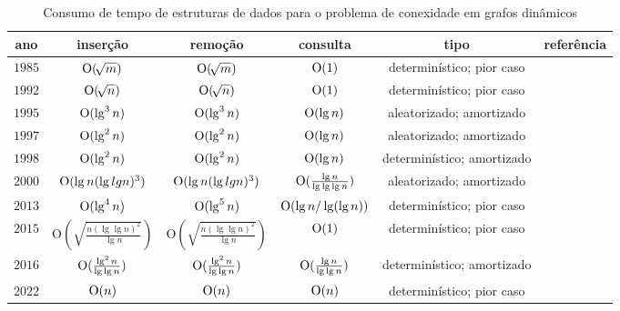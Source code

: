 \begin{table}[h!]
\centering
\begin{tabular}{||c | c | c | c | c | c||} 
 \hline
 ano & inserção & remoção & consulta & tipo & referência \\ [0.5ex] 
 \hline\hline
  $1985$ & $\mathrm{O}(\!\sqrt{m})$ & $\mathrm{O}(\!\sqrt{m})$ & $\mathrm{O}(1)$  & determinístico; pior caso& \cite{frederickson1983data} \\ 
 \hline
  $1992$ & $\mathrm{O}(\!\sqrt{n})$ & $\mathrm{O}(\!\sqrt{n})$ & $\mathrm{O}(1)$  & determinístico; pior caso& \cite{Eppstein1992SparsificationaTF} \\ 
 \hline
  $1995$ & $\mathrm{O}(\lg^3 n)$ & $\mathrm{O}(\lg^3 n)$   & $\mathrm{O}(\lg n)$  & aleatorizado; amortizado & \cite{HenzingerKing} \\ 
 \hline
  $1997$ & $\mathrm{O}(\lg^2 n)$ & $\mathrm{O}(\lg^2 n)$   & $\mathrm{O}(\lg n)$  & aleatorizado; amortizado & \cite{HenzingerThorup} \\ 
 \hline
  $1998$ & $\mathrm{O}(\lg^2 n)$ & $\mathrm{O}(\lg^2 n)$   & $\mathrm{O}(\lg n)$  & determinístico; amortizado & \cite{poly_log} \\ 
 \hline
  $2000$ & $\mathrm{O}(\lg n(\lg lg n)^3)$ &  $\mathrm{O}(\lg n(\lg lg n)^3)$      & $\mathrm{O}(\frac{\lg n}{\lg\lg\lg n})$  & aleatorizado; amortizado & \cite{Thorup2000} \\ 
 \hline
  $2013$ & $\mathrm{O}(\lg^4 n)$ & $\mathrm{O}(\lg^5 n)$ & $\mathrm{O}(\lg n / \lg(\lg n))$ & determinístico; pior caso& \cite{bruceM} \\
 \hline
  $2015$ & $ \mathrm{O}\!\left(\sqrt{\frac{n\left(\lg \lg n\right)^2}{\lg n}}\right)  $ & $\mathrm{O}\!\left(\sqrt{\frac{n\left(\lg \lg n\right)^2}{\lg n}}\right)$ & $\mathrm{O}(1)$ & determinístico; pior caso& \cite{kejlbergrasmussen_et_al} \\
 \hline
  $2016$ & $\mathrm{O}(  \frac{\lg^2 n}{\lg \lg n})$ & $\mathrm{O}( \frac{\lg^2 n}{\lg \lg n}) $   & $\mathrm{O}( \frac{\lg n}{\lg \lg n}) $  & determinístico; amortizado & \cite{Wulff-Nilsen2016} \\ 
 \hline
  $2022$ & $\mathrm{O}(n)$ & $\mathrm{O}(n) $   & $\mathrm{O}(n) $  & determinístico; pior caso  & \cite{QC22} \\ 
 \hline
\end{tabular}
\caption{Consumo de tempo de estruturas de dados para o problema de conexidade em grafos dinâmicos}
\label{table:1}
\end{table}

